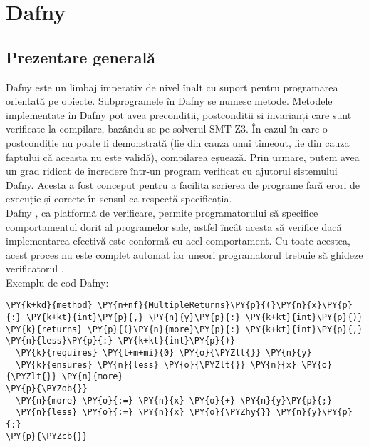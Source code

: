 \chapter{Dafny}
\section{Prezentare generală}

Dafny este un limbaj imperativ de nivel înalt cu suport pentru programarea orientată pe obiecte. Subprogramele în Dafny se numesc metode.  Metodele implementate în Dafny
pot avea precondiții, postcondiții și invarianți care sunt verificate la compilare, bazându-se pe solverul SMT Z3. În cazul în care o postcondiție nu poate fi demonstrată (fie din cauza unui timeout, fie din cauza faptului că aceasta nu este validă), compilarea eșuează. Prin urmare, putem avea un grad ridicat de încredere într-un program verificat cu ajutorul sistemului Dafny.
Acesta a fost conceput pentru a facilita scrierea de programe fară erori de execuție și corecte în sensul că respectă specificația.\\
Dafny \cite{DBLP:journals/corr/abs-1909-01743}, ca platformă de verificare,  permite programatorului să specifice comportamentul dorit al programelor sale, astfel încât acesta să verifice dacă implementarea efectivă este conformă cu acel comportament. Cu toate acestea, acest proces nu este complet automat iar uneori programatorul trebuie să ghideze verificatorul \cite{DBLP:journals/jlap/BlazquezMS23}.\\

Exemplu de cod Dafny:
\begin{small}
\begin{Verbatim}[commandchars=\\\{\}]
\PY{k+kd}{method} \PY{n+nf}{MultipleReturns}\PY{p}{(}\PY{n}{x}\PY{p}{:} \PY{k+kt}{int}\PY{p}{,} \PY{n}{y}\PY{p}{:} \PY{k+kt}{int}\PY{p}{)} \PY{k}{returns} \PY{p}{(}\PY{n}{more}\PY{p}{:} \PY{k+kt}{int}\PY{p}{,} \PY{n}{less}\PY{p}{:} \PY{k+kt}{int}\PY{p}{)}
  \PY{k}{requires} \PY{l+m+mi}{0} \PY{o}{\PYZlt{}} \PY{n}{y}
  \PY{k}{ensures} \PY{n}{less} \PY{o}{\PYZlt{}} \PY{n}{x} \PY{o}{\PYZlt{}} \PY{n}{more}
\PY{p}{\PYZob{}}
  \PY{n}{more} \PY{o}{:=} \PY{n}{x} \PY{o}{+} \PY{n}{y}\PY{p}{;}
  \PY{n}{less} \PY{o}{:=} \PY{n}{x} \PY{o}{\PYZhy{}} \PY{n}{y}\PY{p}{;}
\PY{p}{\PYZcb{}}
\end{Verbatim}
\end{small}
